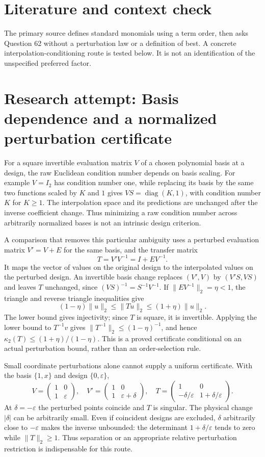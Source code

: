 \documentclass[11pt]{article}
\begin{document}
\section{Literature and context check}
The primary source defines standard monomials using a term order, then asks Question 62 without a perturbation law or a definition of best. A concrete interpolation-conditioning route is tested below. It is not an identification of the unspecified preferred factor.
\section{Research attempt: Basis dependence and a normalized perturbation certificate}
For a square invertible evaluation matrix $V$ of a chosen polynomial basis at a design, the raw Euclidean condition number depends on basis scaling. For example $V=I_2$ has condition number one, while replacing its basis by the same two functions scaled by $K$ and $1$ gives $VS=\operatorname{diag}(K,1)$, with condition number $K$ for $K\ge1$. The interpolation space and its predictions are unchanged after the inverse coefficient change. Thus minimizing a raw condition number across arbitrarily normalized bases is not an intrinsic design criterion.

A comparison that removes this particular ambiguity uses a perturbed evaluation matrix $V'=V+E$ for the same basis, and the transfer matrix
\[
T=V'V^{-1}=I+EV^{-1}.
\]
It maps the vector of values on the original design to the interpolated values on the perturbed design. An invertible basis change replaces $(V',V)$ by $(V'S,VS)$ and leaves $T$ unchanged, since $(VS)^{-1}=S^{-1}V^{-1}$. If $\|EV^{-1}\|_2=\eta<1$, the triangle and reverse triangle inequalities give
\[
(1-\eta)\|u\|_2\le\|Tu\|_2\le(1+\eta)\|u\|_2.
\]
The lower bound gives injectivity; since $T$ is square, it is invertible. Applying the lower bound to $T^{-1}v$ gives $\|T^{-1}\|_2\le(1-\eta)^{-1}$, and hence $\kappa_2(T)\le(1+\eta)/(1-\eta)$. This is a proved certificate conditional on an actual perturbation bound, rather than an order-selection rule.

Small coordinate perturbations alone cannot supply a uniform certificate. With the basis $\{1,x\}$ and design $\{0,\varepsilon\}$,
\[
V=\begin{pmatrix}1&0\\1&\varepsilon\end{pmatrix},\quad
V'=\begin{pmatrix}1&0\\1&\varepsilon+\delta\end{pmatrix},\quad
T=\begin{pmatrix}1&0\\-\delta/\varepsilon&1+\delta/\varepsilon\end{pmatrix}.
\]
At $\delta=-\varepsilon$ the perturbed points coincide and $T$ is singular. The physical change $|\delta|$ can be arbitrarily small. Even if coincident designs are excluded, $\delta$ arbitrarily close to $-\varepsilon$ makes the inverse unbounded: the determinant $1+\delta/\varepsilon$ tends to zero while $\|T\|_2\ge1$. Thus separation or an appropriate relative perturbation restriction is indispensable for this route.
\end{document}
